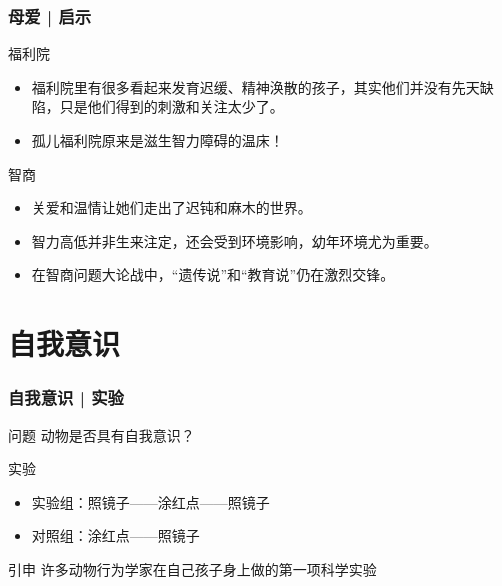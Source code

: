 \begin{frame}
  \frametitle{母爱 | 启示}
  \begin{block}{福利院}
    \begin{itemize}
      \item 福利院里有很多看起来发育迟缓、精神涣散的孩子，其实他们并没有先天缺陷，只是他们得到的刺激和关注太少了。
      \item 孤儿福利院原来是滋生智力障碍的温床！
    \end{itemize}
  \end{block}
  \pause
  \begin{block}{智商}
    \begin{itemize}
      \item 关爱和温情让她们走出了迟钝和麻木的世界。
      \item 智力高低并非生来注定，还会受到环境影响，幼年环境尤为重要。
      \item 在智商问题大论战中，“遗传说”和“教育说”仍在激烈交锋。
    \end{itemize}
  \end{block}
\end{frame}

\section{自我意识}
\begin{frame}
  \frametitle{自我意识 | 实验}
  \begin{block}{问题}
    动物是否具有自我意识？
  \end{block}
  \pause
  \begin{block}{实验}
    \begin{itemize}
      \item 实验组：照镜子——涂红点——照镜子
      \item 对照组：涂红点——照镜子
    \end{itemize}
  \end{block}
  \pause
  \begin{block}{引申}
    许多动物行为学家在自己孩子身上做的第一项科学实验
  \end{block}
\end{frame}

